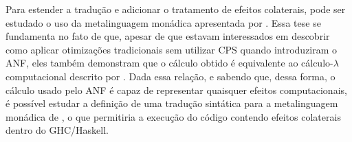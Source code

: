Para estender a tradução e adicionar o tratamento de efeitos colaterais, pode ser estudado o uso da metalinguagem monádica apresentada por . Essa tese se fundamenta no fato de que, apesar de que  estavam interessados em descobrir como aplicar otimizações tradicionais sem utilizar CPS quando introduziram o ANF, eles também demonstram que o cálculo obtido é equivalente ao cálculo-$\lambda$ computacional descrito por . Dada essa relação, e sabendo que, dessa forma, o cálculo usado pelo ANF é capaz de representar quaisquer efeitos computacionais, é possível estudar a definição de uma tradução sintática para a metalinguagem monádica de , o que permitiria a execução do código contendo efeitos colaterais dentro do GHC/Haskell.
